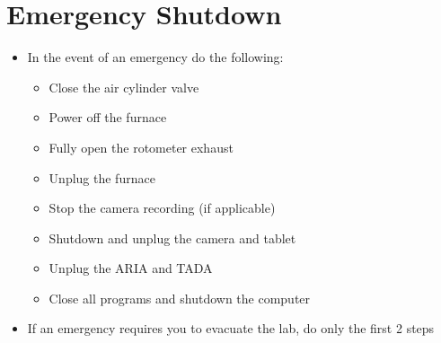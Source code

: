 \documentclass[letterpaper,11pt]{article}
\begin{document}
\section{Emergency Shutdown} \label{sec:e_shtdn}

    \begin{itemize}
    \item In the event of an emergency do the following:
        
        \begin{itemize}
        \item Close the air cylinder valve
        \item Power off the furnace
        \item Fully open the rotometer exhaust
        \item Unplug the furnace
        \item Stop the camera recording (if applicable)
        \item Shutdown and unplug the camera and tablet
        \item Unplug the ARIA and TADA
        \item Close all programs and shutdown the computer
        \end{itemize}
    
    \item If an emergency requires you to evacuate the lab, do only the first 
        2 steps
    \end{itemize}
    
\end{document}

